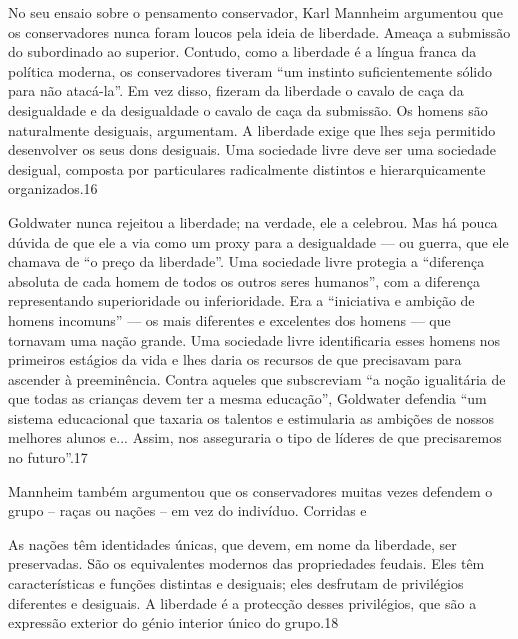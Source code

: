  \par 
No seu ensaio sobre o pensamento conservador, Karl Mannheim argumentou que os conservadores nunca foram loucos pela ideia de liberdade. Ameaça a submissão do subordinado ao superior. Contudo, como a liberdade é a língua franca da política moderna, os conservadores tiveram “um instinto suficientemente sólido para não atacá-la”. Em vez disso, fizeram da liberdade o cavalo de caça da desigualdade e da desigualdade o cavalo de caça da submissão. Os homens são naturalmente desiguais, argumentam. A liberdade exige que lhes seja permitido desenvolver os seus dons desiguais. Uma sociedade livre deve ser uma sociedade desigual, composta por particulares radicalmente distintos e hierarquicamente organizados.{\color{blue}16}
 \par 
Goldwater nunca rejeitou a liberdade; na verdade, ele a celebrou. Mas há pouca dúvida de que ele a via como um proxy para a desigualdade — ou guerra, que ele chamava de “o preço da liberdade”. Uma sociedade livre protegia a “diferença absoluta de cada homem de todos os outros seres humanos”, com a diferença representando superioridade ou inferioridade. Era a “iniciativa e ambição de homens incomuns” — os mais diferentes e excelentes dos homens — que tornavam uma nação grande. Uma sociedade livre identificaria esses homens nos primeiros estágios da vida e lhes daria os recursos de que precisavam para ascender à preeminência. Contra aqueles que subscreviam “a noção igualitária de que todas as crianças devem ter a mesma educação”, Goldwater defendia “um sistema educacional que taxaria os talentos e estimularia as ambições de nossos melhores alunos e... Assim, nos asseguraria o tipo de líderes de que precisaremos no futuro”.{\color{blue}17}
 \par 
Mannheim também argumentou que os conservadores muitas vezes defendem o grupo – raças ou nações – em vez do indivíduo. Corridas e
 \par 
As nações têm identidades únicas, que devem, em nome da liberdade, ser preservadas. São os equivalentes modernos das propriedades feudais. Eles têm características e funções distintas e desiguais; eles desfrutam de privilégios diferentes e desiguais. A liberdade é a protecção desses privilégios, que são a expressão exterior do génio interior único do grupo.{\color{blue}18}
 \par 
